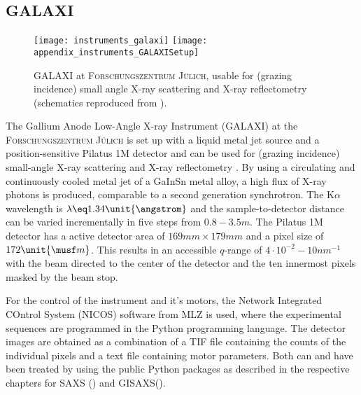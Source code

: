 \documentclass[\main/dresen_thesis.tex]{subfiles}
\begin{document}
  \subsection{GALAXI}\label{ch:lss:galaxi}
    \begin{figure}[ht]
      \centering
      \texttt{[image: instruments\_galaxi]}
      \texttt{[image: appendix\_instruments\_GALAXISetup]}
      \caption{\label{fig:lss:galaxi}GALAXI at \textsc{Forschungszentrum J\"ulich}, usable for (grazing incidence) small angle X-ray scattering and X-ray reflectometry (schematics reproduced from \cite{FZJ_2016_GALAX}).}
    \end{figure}

    The Gallium Anode Low-Angle X-ray Instrument (GALAXI) at the \textsc{Forschungszentrum J\"ulich} is set up with a liquid metal jet source and a position-sensitive Pilatus 1M detector and can be used for (grazing incidence) small-angle X-ray scattering and X-ray reflectometry \cite{FZJ_2016_GALAX}.
    By using a circulating and continuously cooled metal jet of a GaInSn metal alloy, a high flux of X-ray photons is produced, comparable to a second generation synchrotron.
    The K$\alpha$ wavelength is $\lambda \eq 1.34 \unit{\angstrom}$ and the sample-to-detector distance can be varied incrementally in five steps from $0.8 - 3.5 \unit{m}$.
    The Pilatus 1M detector has a active detector area of $169 \unit{mm} \times 179 \unit{mm}$ and a pixel size of $172 \unit{\musf m}$.
    This results in an accessible $q$-range of $4 \cdot 10^{-2} - 10 \unit{nm}^{-1}$ with the beam directed to the center of the detector and the ten innermost pixels masked by the beam stop.

    For the control of the instrument and it's motors, the Network Integrated COntrol System (NICOS) software from MLZ is used, where the experimental sequences are programmed in the Python programming language.
    The detector images are obtained as a combination of a TIF file containing the counts of the individual pixels and a text file containing motor parameters.
    Both can and have been treated by using the public Python packages as described in the respective chapters for SAXS () and GISAXS().
\end{document}
